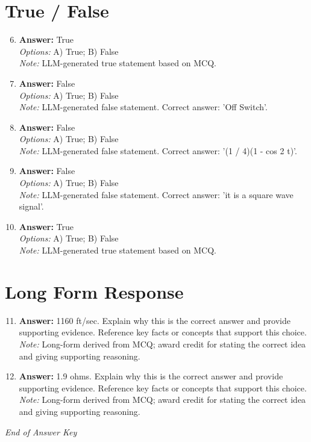 \documentclass[12pt]{article}
\begin{document}
\section*{True / False}
\begin{enumerate}[label=\arabic*.]
\setcounter{enumi}{5}
\item \textbf{Answer:} True
\\ \textit{Options:} A) True; B) False
\\ \textit{Note:} LLM-generated true statement based on MCQ.
\item \textbf{Answer:} False
\\ \textit{Options:} A) True; B) False
\\ \textit{Note:} LLM-generated false statement. Correct answer: 'Off Switch'.
\item \textbf{Answer:} False
\\ \textit{Options:} A) True; B) False
\\ \textit{Note:} LLM-generated false statement. Correct answer: '(1 / 4)(1 - cos 2 t)'.
\item \textbf{Answer:} False
\\ \textit{Options:} A) True; B) False
\\ \textit{Note:} LLM-generated false statement. Correct answer: 'it is a square wave signal'.
\item \textbf{Answer:} True
\\ \textit{Options:} A) True; B) False
\\ \textit{Note:} LLM-generated true statement based on MCQ.
\end{enumerate}

\section*{Long Form Response}
\begin{enumerate}[label=\arabic*.]
\setcounter{enumi}{10}
\item \textbf{Answer:} 1160 ft/sec. Explain why this is the correct answer and provide supporting evidence. Reference key facts or concepts that support this choice.
\\ \textit{Note:} Long-form derived from MCQ; award credit for stating the correct idea and giving supporting reasoning.
\item \textbf{Answer:} 1.9 ohms. Explain why this is the correct answer and provide supporting evidence. Reference key facts or concepts that support this choice.
\\ \textit{Note:} Long-form derived from MCQ; award credit for stating the correct idea and giving supporting reasoning.
\end{enumerate}

\vfill
\noindent\textit{End of Answer Key}
\end{document}
